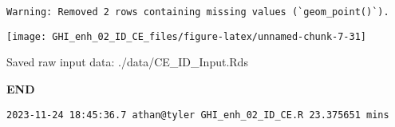 \documentclass[
  10pt,
  a4paper,oneside]{article}
\begin{document}
\begin{verbatim}
Warning: Removed 2 rows containing missing values (`geom_point()`).
\end{verbatim}

\begin{center}\texttt{[image: GHI\_enh\_02\_ID\_CE\_files/figure-latex/unnamed-chunk-7-31]} \end{center}

Saved raw input data: ./data/CE\_ID\_Input.Rds

\textbf{END}

\begin{verbatim}
2023-11-24 18:45:36.7 athan@tyler GHI_enh_02_ID_CE.R 23.375651 mins
\end{verbatim}
\end{document}
